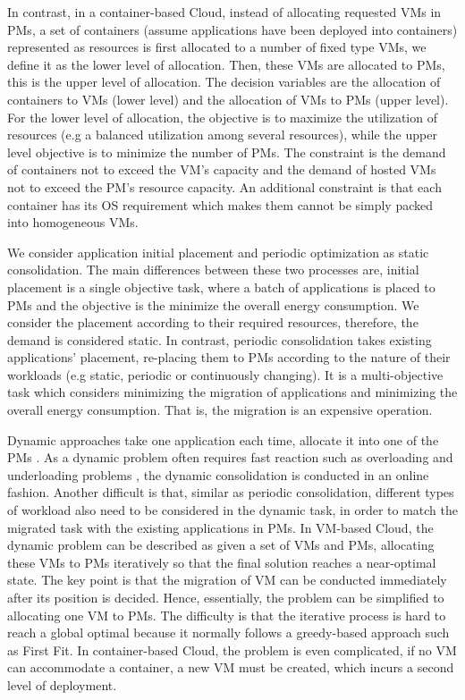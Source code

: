 In contrast, in a container-based Cloud, instead of allocating requested VMs in PMs, a set of containers (assume applications have been deployed into containers) represented as resources is first allocated to a number of fixed type VMs, we define it as the lower level of allocation. Then, these VMs are allocated to PMs, this is the upper level of allocation. The decision variables are the allocation of containers to VMs (lower level) and the allocation of VMs  to PMs (upper level). For the lower level of allocation, the objective is to maximize the utilization of resources (e.g a balanced utilization among several resources), while the upper level objective is to minimize the number of PMs. The constraint is the demand of containers not to exceed the VM's capacity and the demand of hosted VMs not to exceed the PM's resource capacity. An additional constraint is that each container has its OS requirement which makes them cannot be simply packed into homogeneous VMs. 

We consider application initial placement and periodic optimization as static consolidation. The main differences between these two processes are, initial placement is a single objective task, where a batch of applications is placed to PMs and the objective is the minimize the overall energy consumption. We consider the placement according to their required resources, therefore, the demand is considered static. In contrast, periodic consolidation takes existing applications' placement, re-placing them to PMs according to the nature of their workloads (e.g static, periodic or continuously changing). It is a multi-objective task which considers minimizing the migration of applications and minimizing the overall energy consumption. That is, the migration is an expensive operation. 


Dynamic approaches take one application each time, allocate it into one of the PMs \cite{Xiao:2015ik}. As a dynamic problem often requires fast reaction such as overloading and underloading problems \cite{Beloglazov:2013ht},
the dynamic consolidation is conducted in an online fashion. Another difficult is that, similar as periodic consolidation, different types of workload also need to be considered in the dynamic task, in order to match the migrated task with the existing applications in PMs. In VM-based Cloud, the dynamic problem can be described as given a set of VMs and PMs, allocating these VMs to PMs iteratively so that the final solution reaches a near-optimal state.
The key point is that the migration of VM can be conducted immediately after its position is decided. Hence, essentially, the problem can be simplified to allocating one VM to PMs. The difficulty is that the iterative process is hard to reach a global optimal because it normally follows a greedy-based approach such as First Fit. In container-based Cloud,  the problem is even complicated, if no VM can accommodate a container, a new VM must be created, which incurs a second level of deployment.


